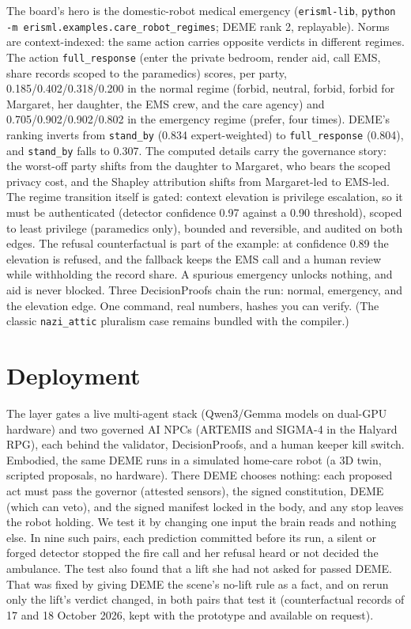 \documentclass[10pt,twocolumn]{article}
\begin{document}
The board's hero is the domestic-robot medical emergency
(\texttt{erisml-lib}, \texttt{python -m erisml.examples.care\_robot\_regimes}; DEME
rank 2, replayable). Norms are context-indexed: the same action carries opposite
verdicts in different regimes. The action \texttt{full\_response} (enter the
private bedroom, render aid, call EMS, share records scoped to the paramedics)
scores, per party, 0.185/0.402/0.318/0.200 in the normal regime (forbid,
neutral, forbid, forbid for Margaret, her daughter, the EMS crew, and the care
agency) and 0.705/0.902/0.902/0.802 in the emergency regime (prefer, four
times). DEME's ranking inverts from \texttt{stand\_by} (0.834 expert-weighted) to
\texttt{full\_response} (0.804), and \texttt{stand\_by} falls to 0.307. The
computed details carry the governance story: the worst-off party shifts from
the daughter to Margaret, who bears the scoped privacy cost, and the Shapley
attribution shifts from Margaret-led to EMS-led. The regime transition itself
is gated: context elevation is privilege escalation, so it must be
authenticated (detector confidence 0.97 against a 0.90 threshold), scoped to
least privilege (paramedics only), bounded and reversible, and audited on both
edges. The refusal counterfactual is part of the example: at confidence 0.89
the elevation is refused, and the fallback keeps the EMS call and a human
review while withholding the record share. A spurious emergency unlocks
nothing, and aid is never blocked. Three DecisionProofs chain the run: normal,
emergency, and the elevation edge. One command, real numbers, hashes you can
verify. (The classic \texttt{nazi\_attic} pluralism case remains bundled with
the compiler.)

\section{Deployment}
The layer gates a live multi-agent stack (Qwen3/Gemma models on dual-GPU hardware)
and two governed AI NPCs (ARTEMIS and SIGMA-4 in the Halyard RPG), each behind the
validator, DecisionProofs, and a human keeper kill switch. Embodied, the same DEME
runs in a simulated home-care robot (a 3D twin, scripted proposals, no hardware).
There DEME chooses nothing: each proposed act must pass the governor (attested
sensors), the signed constitution, DEME (which can veto), and the signed
manifest locked in the body, and any stop leaves the robot holding. We test it by
changing one input the brain reads and nothing else. In nine such pairs, each
prediction committed before its run, a silent or forged detector stopped the
fire call and her refusal heard or not decided the ambulance. The test also found
that a lift she had not asked for passed DEME. That was fixed by giving DEME the
scene's no-lift rule as a fact, and on rerun only the lift's verdict changed, in
both pairs that test it (counterfactual records of 17 and 18 October 2026, kept
with the prototype and available on request).
\end{document}

